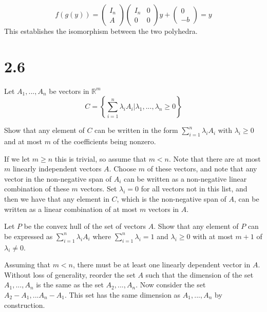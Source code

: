 \documentclass[12pt]{paper}
\newcommand{\setR}{ \mathbb{R} }
\begin{document}
\begin{equation*}
  f(g(y)) =
  \begin{pmatrix}
    I_n\\
    A
  \end{pmatrix}
  \begin{pmatrix}
    I_n & 0\\
    0 & 0
  \end{pmatrix}
  y +
  \begin{pmatrix}
    0\\
    -b
  \end{pmatrix} = y
\end{equation*}
This establishes the isomorphism between the two polyhedra.

\section{2.6}

Let $A_1,...,A_n$ be vectors in $\setR^m$
\begin{equation*}
  C = \left\{ \sum_{i=1}^n \lambda_i A_i \Big \vert \lambda_1,...,\lambda_n \geq 0 \right\}
\end{equation*}

Show that any element of $C$ can be written in the form $\sum_{i=1}^n \lambda_i
A_i$ with $\lambda_i \geq 0$ and at most $m$ of the coefficients being nonzero.

\vspace{.3in}

If we let $m \geq n$ this is trivial, so assume that $m < n$. Note that
there are at most $m$ linearly independent vectors $A$. Choose $m$ of
these vectors, and note that any vector in the non-negative span of
$A_i$ can be written as a non-negative linear combination of these $m$
vectors. Set $\lambda_i =0$ for all vectors not in this list, and then we
have that any element in $C$, which is the non-negative span of $A$,
can be written as a linear combination of at most $m$ vectors in $A$.

\vspace{.3in}

Let $P$ be the convex hull of the set of vectors $A$. Show that any
element of $P$ can be expressed as $\sum_{i=1}^n \lambda_i A_i$ where
$\sum_{i=1}^n \lambda_i = 1$ and $\lambda_i\geq 0 $ with at most $m+1$ of $\lambda_i \neq 0$.

\vspace{.3in}
Assuming that $m < n$, there must be at least one linearly dependent
vector in $A$. Without loss of generality, reorder the set $A$ such
that the dimension of the set $A_1,...,A_{n}$ is the same as the set
$A_2, ..., A_n$. Now consider the set $A_2 - A_1, ... A_n - A_1$. This
set has the same dimension as $A_1, ..., A_n$ by construction.
\end{document}
